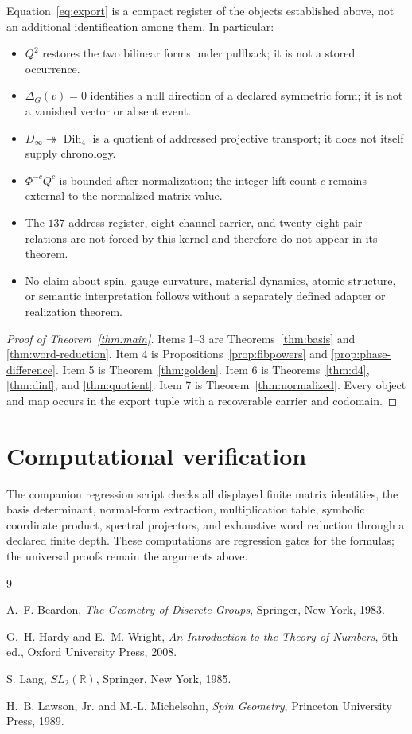 \documentclass[11pt,letterpaper]{article}
\theoremstyle{kernelstyle}
\newcommand{\Dih}{\operatorname{Dih}}
\begin{document}
Equation~\eqref{eq:export} is a compact register of the objects established above, not an additional identification among them. In particular:
\begin{itemize}
  \item $Q^2$ restores the two bilinear forms under pullback; it is not a stored occurrence.
  \item $\Delta_G(v)=0$ identifies a null direction of a declared symmetric form; it is not a vanished vector or absent event.
  \item $D_\infty\twoheadrightarrow\Dih_4$ is a quotient of addressed projective transport; it does not itself supply chronology.
  \item $\Phi^{-c}Q^c$ is bounded after normalization; the integer lift count $c$ remains external to the normalized matrix value.
  \item The $137$-address register, eight-channel carrier, and twenty-eight pair relations are not forced by this kernel and therefore do not appear in its theorem.
  \item No claim about spin, gauge curvature, material dynamics, atomic structure, or semantic interpretation follows without a separately defined adapter or realization theorem.
\end{itemize}

\begin{proof}[Proof of Theorem~\ref{thm:main}]
Items 1--3 are Theorems~\ref{thm:basis} and \ref{thm:word-reduction}.  Item 4 is Propositions~\ref{prop:fibpowers} and \ref{prop:phase-difference}.  Item 5 is Theorem~\ref{thm:golden}.  Item 6 is Theorems~\ref{thm:d4}, \ref{thm:dinf}, and \ref{thm:quotient}.  Item 7 is Theorem~\ref{thm:normalized}.  Every object and map occurs in the export tuple with a recoverable carrier and codomain.
\end{proof}

\section{Computational verification}

The companion regression script checks all displayed finite matrix identities, the basis determinant, normal-form extraction, multiplication table, symbolic coordinate product, spectral projectors, and exhaustive word reduction through a declared finite depth. These computations are regression gates for the formulas; the universal proofs remain the arguments above.

\begin{thebibliography}{9}
\small

A.~F. Beardon,
\emph{The Geometry of Discrete Groups},
Springer, New York, 1983.

G.~H. Hardy and E.~M. Wright,
\emph{An Introduction to the Theory of Numbers},
6th ed., Oxford University Press, 2008.

S. Lang,
\emph{$SL_2(\mathbb R)$},
Springer, New York, 1985.

H.~B. Lawson, Jr. and M.-L. Michelsohn,
\emph{Spin Geometry},
Princeton University Press, 1989.

\end{thebibliography}
\end{document}
